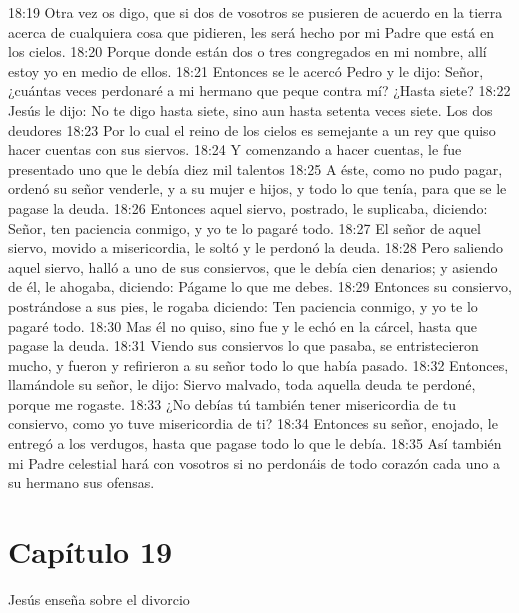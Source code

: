 18:19 Otra vez os digo, que si dos de vosotros se pusieren de acuerdo en la tierra acerca de cualquiera cosa que pidieren, les será hecho por mi Padre que está en los cielos. 
18:20 Porque donde están dos o tres congregados en mi nombre, allí estoy yo en medio de ellos. 
18:21 Entonces se le acercó Pedro y le dijo: Señor, ¿cuántas veces perdonaré a mi hermano que peque contra mí? ¿Hasta siete? 
18:22 Jesús le dijo: No te digo hasta siete, sino aun hasta setenta veces siete. 
Los dos deudores 
18:23 Por lo cual el reino de los cielos es semejante a un rey que quiso hacer cuentas con sus siervos. 
18:24 Y comenzando a hacer cuentas, le fue presentado uno que le debía diez mil talentos
18:25 A éste, como no pudo pagar, ordenó su señor venderle, y a su mujer e hijos, y todo lo que tenía, para que se le pagase la deuda. 
18:26 Entonces aquel siervo, postrado, le suplicaba, diciendo: Señor, ten paciencia conmigo, y yo te lo pagaré todo. 
18:27 El señor de aquel siervo, movido a misericordia, le soltó y le perdonó la deuda. 
18:28 Pero saliendo aquel siervo, halló a uno de sus consiervos, que le debía cien denarios; y asiendo de él, le ahogaba, diciendo: Págame lo que me debes. 
18:29 Entonces su consiervo, postrándose a sus pies, le rogaba diciendo: Ten paciencia conmigo, y yo te lo pagaré todo. 
18:30 Mas él no quiso, sino fue y le echó en la cárcel, hasta que pagase la deuda. 
18:31 Viendo sus consiervos lo que pasaba, se entristecieron mucho, y fueron y refirieron a su señor todo lo que había pasado. 
18:32 Entonces, llamándole su señor, le dijo: Siervo malvado, toda aquella deuda te perdoné, porque me rogaste. 
18:33 ¿No debías tú también tener misericordia de tu consiervo, como yo tuve misericordia de ti? 
18:34 Entonces su señor, enojado, le entregó a los verdugos, hasta que pagase todo lo que le debía. 18:35 Así también mi Padre celestial hará con vosotros si no perdonáis de todo corazón cada uno a su hermano sus ofensas. 
\section*{Capítulo 19}
Jesús enseña sobre el divorcio  

